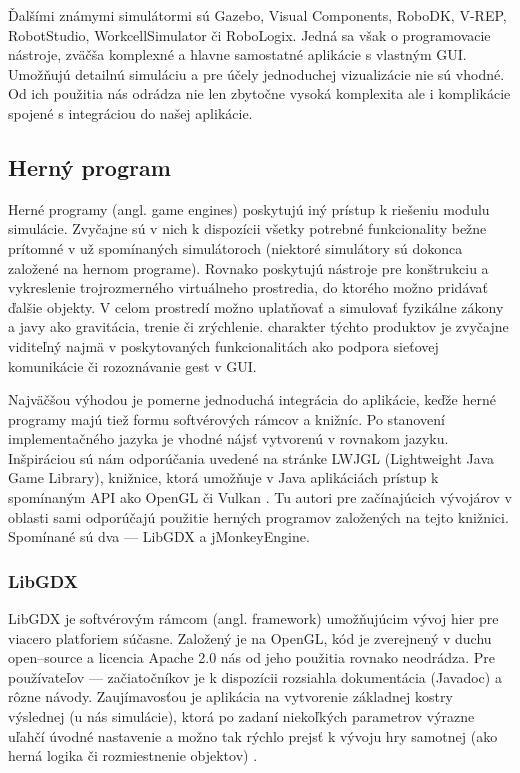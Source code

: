 Ďalšími známymi simulátormi sú Gazebo, Visual Components, RoboDK, V-REP, RobotStudio, WorkcellSimulator či RoboLogix. Jedná sa však o programovacie nástroje, zväčša komplexné a hlavne samostatné aplikácie s vlastným GUI. Umožňujú detailnú simuláciu a pre účely jednoduchej vizualizácie nie sú vhodné. Od ich použitia nás odrádza nie len zbytočne vysoká komplexita ale i komplikácie spojené s integráciou do našej aplikácie.


\subsection{Herný program}
\label{sub:herny-program}
Herné programy (angl. game engines) poskytujú iný prístup k riešeniu modulu simulácie. Zvyčajne sú v nich k dispozícii všetky potrebné funkcionality bežne prítomné v už spomínaných simulátoroch (niektoré simulátory sú dokonca založené na hernom programe). Rovnako poskytujú nástroje pre konštrukciu a vykreslenie trojrozmerného virtuálneho prostredia, do ktorého možno pridávať ďalšie objekty. V celom prostredí možno uplatňovať a simulovať fyzikálne zákony a javy ako gravitácia, trenie či zrýchlenie.  charakter týchto produktov je zvyčajne viditeľný najmä v poskytovaných funkcionalitách ako podpora sieťovej komunikácie či rozoznávanie gest v GUI.

Najväčšou výhodou je pomerne jednoduchá integrácia do aplikácie, keďže herné programy majú tiež formu softvérových rámcov a knižníc. Po stanovení implementačného jazyka je vhodné nájsť  vytvorenú v rovnakom jazyku. Inšpiráciou sú nám odporúčania uvedené na stránke LWJGL (Lightweight Java Game Library), knižnice, ktorá umožňuje v Java aplikáciách prístup k spomínaným API ako OpenGL či Vulkan \cite{LWJGL}. Tu autori pre začínajúcich vývojárov v oblasti sami odporúčajú použitie herných programov založených na tejto knižnici. Spomínané sú dva --- LibGDX a jMonkeyEngine.

\subsubsection{LibGDX}
LibGDX je softvérovým rámcom (angl. framework) umožňujúcim vývoj hier pre viacero platforiem súčasne. Založený je na OpenGL, kód je zverejnený v duchu open--source a licencia Apache 2.0 nás od jeho použitia rovnako neodrádza. Pre používateľov --- začiatočníkov je k dispozícii rozsiahla dokumentácia (Javadoc) a rôzne návody. Zaujímavosťou je aplikácia na vytvorenie základnej kostry výslednej  (u nás simulácie), ktorá po zadaní niekoľkých parametrov výrazne uľahčí úvodné nastavenie a možno tak rýchlo prejsť k vývoju hry samotnej (ako herná logika či rozmiestnenie objektov) \cite{LibGDXProjectGenerator}.

